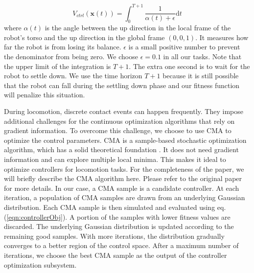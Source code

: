 \begin{equation}
  V_{ctrl}(\mathbf{x}(t))=\int_0^{T+1} \frac{1}{\alpha(t)+\epsilon}\mathrm{d}t
  \label{eqn:controllerObj}
\end{equation}
where $\alpha(t)$ is the angle between the up direction in the local frame of the robot's torso and the up direction in the global frame $(0,0,1)$. It measures how far the robot is from losing its balance. $\epsilon$ is a small positive number to prevent the denominator from being zero. We choose $\epsilon=0.1$ in all our tasks. Note that the upper limit of the integration is $T+1$. The extra one second is to wait for the robot to settle down. We use the time horizon $T+1$ because it is still possible that the robot can fall during the settling down phase and our fitness function will penalize this situation.

During locomotion, discrete contact events can happen frequently. They impose additional challenges for the continuous optimization algorithms that rely on gradient information. To overcome this challenge, we choose to use CMA to optimize the control parameters. CMA is a sample-based stochastic optimization algorithm, which has a solid theoretical foundation \cite{akimoto:2010,glasmachers:2010}. It does not need gradient information and can explore multiple local minima. This makes it ideal to optimize controllers for locomotion tasks. For the completeness of the paper, we will briefly describe the CMA algorithm here. Please refer to the original paper \cite{Hansen:2009} for more details. In our case, a CMA sample is a candidate controller. At each iteration, a population of CMA samples are drawn from an underlying Gaussian distribution. Each CMA sample is then simulated and evaluated using eq.(\ref{eqn:controllerObj}). A portion of the samples with lower fitness values are discarded. The underlying Gaussian distribution is updated according to the remaining good samples. With more iterations, the distribution gradually converges to a better region of the control space. After a maximum number of iterations, we choose the best CMA sample as the output of the controller optimization subsystem.
